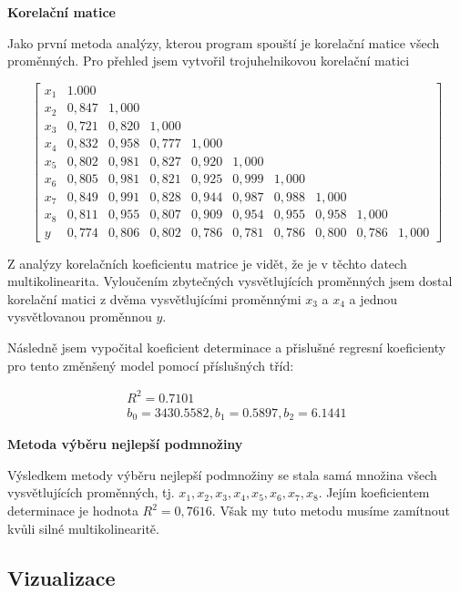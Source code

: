 \documentclass[a4paper,12pt,twoside]{scrreprt}
\begin{document}
\normalsize\textbf{\newline Korelační matice} 

Jako první metoda analýzy, kterou program spouští je korelační matice všech proměnných. Pro přehled jsem vytvořil trojuhelnikovou korelační matici

$$
\begin{bmatrix}
x_1 & 1.000\\
x_2 & 0,847 & 1,000\\
x_3 & 0,721 & 0,820 & 1,000\\
x_4 & 0,832 & 0,958 & 0,777 & 1,000 \\
x_5 & 0,802 & 0,981 & 0,827 & 0,920 & 1,000 \\
x_6 & 0,805 & 0,981 & 0,821 &0,925 & 0,999 & 1,000 \\
x_7 & 0,849 & 0,991 & 0,828 & 0,944 & 0,987 & 0,988 & 1,000 \\
x_8 & 0,811 & 0,955 & 0,807 & 0,909 & 0,954 & 0,955 & 0,958 & 1,000 \\
y & 0,774 & 0,806 & 0,802 & 0,786 & 0,781 & 0,786 & 0,800 & 0,786 & 1,000 
\end{bmatrix}
$$

Z analýzy korelačních koeficientu matrice je vidět, že je v těchto datech multikolinearita. Vyloučením zbytečných vysvětlujících proměnných jsem dostal korelační matici z dvěma vysvětlujícími proměnnými $x_3$ a $x_4$ a jednou vysvětlovanou proměnnou $y$.   

Následně jsem vypočital koeficient determinace a přislušné regresní koeficienty pro tento změnšený model pomocí příslušných tříd: 

\begin{displaymath}
\begin{array}{ll}
R^2 = 0.7101 \\
b_0 = 3430.5582, b_1 = 0.5897, b_2 = 6.1441
\end{array}
\end{displaymath}

\normalsize\textbf{\newline Metoda výběru nejlepší podmnožiny}

Výsledkem metody výběru nejlepší podmnožiny se stala samá množina všech vysvětlujících proměnných, tj. ${x_1, x_2, x_3, x_4, x_5, x_6, x_7, x_8}$. Jejím koeficientem determinace je hodnota $R^2 = 0,7616$. Však my tuto metodu musíme zamítnout kvůli silné multikolinearitě.  

\subsection{Vizualizace}
\end{document}
